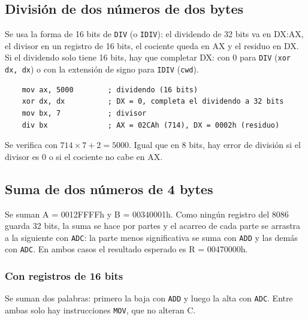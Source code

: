 \documentclass[10pt]{article}
\begin{document}
\subsection{División de dos números de dos bytes}
 
Se usa la forma de 16 bits de \texttt{DIV} (o \texttt{IDIV}): el dividendo de 32 bits va en DX:AX, el divisor en un registro de 16 bits, el cociente queda en AX y el residuo en DX. Si el dividendo solo tiene 16 bits, hay que completar DX: con 0 para \texttt{DIV} (\texttt{xor dx, dx}) o con la extensión de signo para \texttt{IDIV} (\texttt{cwd}).
 
\begin{verbatim}
    mov ax, 5000        ; dividendo (16 bits)
    xor dx, dx          ; DX = 0, completa el dividendo a 32 bits
    mov bx, 7           ; divisor
    div bx              ; AX = 02CAh (714), DX = 0002h (residuo)
\end{verbatim}
 
Se verifica con $714 \times 7 + 2 = 5000$. Igual que en 8 bits, hay error de división si el divisor es 0 o si el cociente no cabe en AX.
 
\subsection{Suma de dos números de 4 bytes}
 
Se suman A = 0012FFFFh y B = 00340001h. Como ningún registro del 8086 guarda 32 bits, la suma se hace por partes y el acarreo de cada parte se arrastra a la siguiente con \texttt{ADC}: la parte menos significativa se suma con \texttt{ADD} y las demás con \texttt{ADC}. En ambos casos el resultado esperado es R = 00470000h.
 
\subsubsection{Con registros de 16 bits}
 
Se suman dos palabras: primero la baja con \texttt{ADD} y luego la alta con \texttt{ADC}. Entre ambas solo hay instrucciones \texttt{MOV}, que no alteran C.
 
\end{document}
